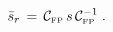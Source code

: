 \begin{equation}
  \label{sbs}
  \bar s_r \,=  \,  \mathcal{C}_{\mbox{\tiny FP}}  \, s\,
  \mathcal{C}_{\mbox{\tiny FP}}^{-1}  \; .
\end{equation}

